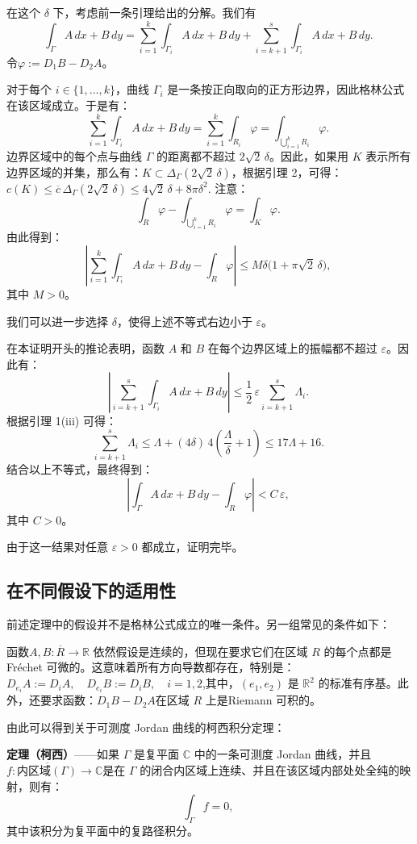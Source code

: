 在这个 $\delta$ 下，考虑前一条引理给出的分解。我们有
$$
\int_{\Gamma} A\,dx + B\,dy 
= \sum_{i=1}^{k} \int_{\Gamma_i} A\,dx + B\,dy 
+ \sum_{i=k+1}^{s} \int_{\Gamma_i} A\,dx + B\,dy.~
$$
令$\varphi := D_1 B - D_2 A$。

对于每个 $i \in \{1, \ldots, k\}$，曲线 $\Gamma_i$ 是一条按正向取向的正方形边界，因此格林公式在该区域成立。于是有：
$$
\sum_{i=1}^{k} \int_{\Gamma_i} A\,dx + B\,dy 
= 
\sum_{i=1}^{k} \int_{R_i} \varphi
= 
\int_{\bigcup_{i=1}^{k} R_i} \varphi.~
$$
边界区域中的每个点与曲线 $\Gamma$ 的距离都不超过 $2\sqrt{2}\,\delta$。因此，如果用 $K$ 表示所有边界区域的并集，那么有：$K \subset \Delta_{\Gamma}(2\sqrt{2}\,\delta)$，根据引理 2，可得：$c(K) \leq \overline{c}\,\Delta_{\Gamma}(2\sqrt{2}\,\delta)\leq 4\sqrt{2}\,\delta + 8\pi\delta^2$.
注意：
$$
\int_{R} \varphi - \int_{\bigcup_{i=1}^{k} R_i} \varphi
= 
\int_{K} \varphi.~
$$
由此得到：
$$
\left| 
\sum_{i=1}^{k} \int_{\Gamma_i} A\,dx + B\,dy 
- 
\int_{R} \varphi 
\right|
\leq 
M\delta \bigl(1 + \pi\sqrt{2}\,\delta \bigr),~
$$
其中 $M > 0$。

我们可以进一步选择 $\delta$，使得上述不等式右边小于 $\varepsilon$。

在本证明开头的推论表明，函数 $A$ 和 $B$ 在每个边界区域上的振幅都不超过 $\varepsilon$。因此有：
$$
\left| 
\sum_{i=k+1}^{s} \int_{\Gamma_i} A\,dx + B\,dy
\right|
\leq 
\frac{1}{2}\,\varepsilon
\sum_{i=k+1}^{s} \Lambda_i .~
$$
根据引理 1(iii) 可得：
$$
\sum_{i=k+1}^{s} \Lambda_i
\leq 
\Lambda + (4\delta)\,4\!\left(\frac{\Lambda}{\delta} + 1\right)
\leq 
17\Lambda + 16.~
$$
结合以上不等式，最终得到：
$$
\left| 
\int_{\Gamma} A\,dx + B\,dy
-
\int_{R} \varphi
\right|
< 
C\,\varepsilon ,~
$$
其中 $C > 0$。

由于这一结果对任意 $\varepsilon > 0$ 都成立，证明完毕。
\subsection{在不同假设下的适用性}
前述定理中的假设并不是格林公式成立的唯一条件。另一组常见的条件如下：

函数$A, B : \overline{R} \to \mathbb{R}$ 依然假设是连续的，但现在要求它们在区域 $R$ 的每个点都是Fréchet 可微的。这意味着所有方向导数都存在，特别是：$D_{e_i} A := D_i A, \quad D_{e_i} B := D_i B, \quad i = 1, 2$,其中，$(e_1, e_2)$ 是 $\mathbb{R}^2$ 的标准有序基。此外，还要求函数：$D_1 B - D_2 A$在区域 $R$ 上是Riemann 可积的。

由此可以得到关于可测度 Jordan 曲线的柯西积分定理：

\textbf{定理（柯西）}——如果 $\Gamma$ 是复平面 $\mathbb{C}$ 中的一条可测度 Jordan 曲线，并且$f : \overline{\text{内区域}(\Gamma)} \to \mathbb{C}$是在 $\Gamma$ 的闭合内区域上连续、并且在该区域内部处处全纯的映射，则有：
$$
\int_{\Gamma} f = 0,~
$$
其中该积分为复平面中的复路径积分。

